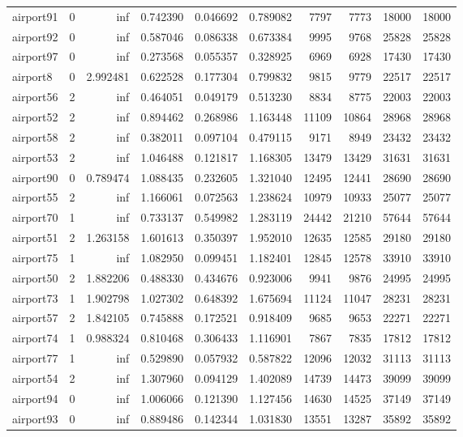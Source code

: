 \begin{longtable}{|l|r|r|r|r|r|r|r|r|r|}
airport91 & 0 & inf & 0.742390 & 0.046692 & 0.789082 & 7797 & 7773 & 18000 & 18000 \\
airport92 & 0 & inf & 0.587046 & 0.086338 & 0.673384 & 9995 & 9768 & 25828 & 25828 \\
airport97 & 0 & inf & 0.273568 & 0.055357 & 0.328925 & 6969 & 6928 & 17430 & 17430 \\
airport8 & 0 & 2.992481 & 0.622528 & 0.177304 & 0.799832 & 9815 & 9779 & 22517 & 22517 \\
airport56 & 2 & inf & 0.464051 & 0.049179 & 0.513230 & 8834 & 8775 & 22003 & 22003 \\
airport52 & 2 & inf & 0.894462 & 0.268986 & 1.163448 & 11109 & 10864 & 28968 & 28968 \\
airport58 & 2 & inf & 0.382011 & 0.097104 & 0.479115 & 9171 & 8949 & 23432 & 23432 \\
airport53 & 2 & inf & 1.046488 & 0.121817 & 1.168305 & 13479 & 13429 & 31631 & 31631 \\
airport90 & 0 & 0.789474 & 1.088435 & 0.232605 & 1.321040 & 12495 & 12441 & 28690 & 28690 \\
airport55 & 2 & inf & 1.166061 & 0.072563 & 1.238624 & 10979 & 10933 & 25077 & 25077 \\
airport70 & 1 & inf & 0.733137 & 0.549982 & 1.283119 & 24442 & 21210 & 57644 & 57644 \\
airport51 & 2 & 1.263158 & 1.601613 & 0.350397 & 1.952010 & 12635 & 12585 & 29180 & 29180 \\
airport75 & 1 & inf & 1.082950 & 0.099451 & 1.182401 & 12845 & 12578 & 33910 & 33910 \\
airport50 & 2 & 1.882206 & 0.488330 & 0.434676 & 0.923006 & 9941 & 9876 & 24995 & 24995 \\
airport73 & 1 & 1.902798 & 1.027302 & 0.648392 & 1.675694 & 11124 & 11047 & 28231 & 28231 \\
airport57 & 2 & 1.842105 & 0.745888 & 0.172521 & 0.918409 & 9685 & 9653 & 22271 & 22271 \\
airport74 & 1 & 0.988324 & 0.810468 & 0.306433 & 1.116901 & 7867 & 7835 & 17812 & 17812 \\
airport77 & 1 & inf & 0.529890 & 0.057932 & 0.587822 & 12096 & 12032 & 31113 & 31113 \\
airport54 & 2 & inf & 1.307960 & 0.094129 & 1.402089 & 14739 & 14473 & 39099 & 39099 \\
airport94 & 0 & inf & 1.006066 & 0.121390 & 1.127456 & 14630 & 14525 & 37149 & 37149 \\
airport93 & 0 & inf & 0.889486 & 0.142344 & 1.031830 & 13551 & 13287 & 35892 & 35892 \\

\end{longtable}
